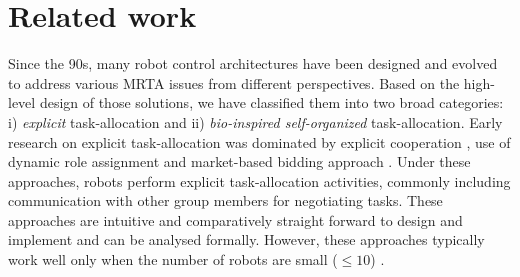 \documentclass[journal]{IEEEtran}
\begin{document}
\section{Related work}
\label{sec:rw}
Since the 90s, many robot control architectures have been designed and evolved to address various MRTA issues from different perspectives. Based on the high-level design of those solutions, we have classified them into two broad categories: i) {\em explicit} task-allocation and ii) {\em bio-inspired self-organized} task-allocation. %
Early research on explicit task-allocation was dominated by explicit cooperation \cite{Parker2008}, use of dynamic role assignment \cite{Chaimowicz2002} and market-based bidding approach \cite{Dias+2006}. Under these approaches, robots perform explicit task-allocation activities, commonly including communication with other group members for negotiating tasks. These approaches are intuitive and comparatively straight forward to design and implement and can be analysed formally. However, these approaches typically work well only when the number of robots are small ($\leq 10$) \cite{Lerman+2006}.
\end{document}

